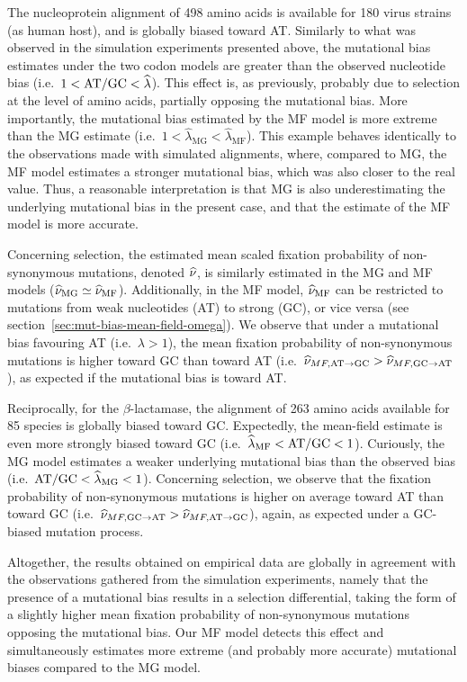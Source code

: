 The nucleoprotein alignment of 498 amino acids is available for 180 virus strains (as human host), and is globally biased toward AT.
Similarly to what was observed in the simulation experiments presented above, the mutational bias estimates under the two codon models are greater than the observed nucleotide bias (i.e.~$1 < \text{AT/GC} < \widehat{\lambda}$).
This effect is, as previously, probably due to selection at the level of amino acids, partially opposing the mutational bias.
More importantly, the mutational bias estimated by the MF model is more extreme than the MG estimate (i.e.~$1 < \widehat{\lambda}_{\text{MG}} < \widehat{\lambda}_{\text{MF}}$).
This example behaves identically to the observations made with simulated alignments, where, compared to MG, the MF model estimates a stronger mutational bias, which was also closer to the real value.
Thus, a reasonable interpretation is that MG is also underestimating the underlying mutational bias in the present case, and that the estimate of the MF model is more accurate.

Concerning selection, the estimated mean scaled fixation probability of non-synonymous mutations, denoted $\widehat{\nu}$, is similarly estimated in the MG and MF models ($\widehat{\nu}_{\text{MG}} \simeq \widehat{\nu}_{\text{MF}}$).
Additionally, in the MF model, $\widehat{\nu}_{\text{MF}}$ can be restricted to mutations from weak nucleotides (AT) to strong (GC), or vice versa (see section~\ref{sec:mut-bias-mean-field-omega}).
We observe that under a mutational bias favouring AT (i.e.~$\lambda > 1$), the mean fixation probability of non-synonymous mutations is higher toward GC than toward AT (i.e.~$\widehat{\nu}_{MF,\text{AT} \rightarrow \text{GC}} > \widehat{\nu}_{MF,\text{GC} \rightarrow \text{AT}}$), as expected if the mutational bias is toward AT.

Reciprocally, for the $\beta$-lactamase, the alignment of 263 amino acids available for 85 species is globally biased toward GC.
Expectedly, the mean-field estimate is even more strongly biased toward GC (i.e.~$\widehat{\lambda}_{\text{MF}} < \text{AT/GC} < 1$).
Curiously, the MG model estimates a weaker underlying mutational bias than the observed bias (i.e.~$ \text{AT/GC} < \widehat{\lambda}_{\text{MG}} < 1$).
Concerning selection, we observe that the fixation probability of non-synonymous mutations is higher on average toward AT than toward GC (i.e.~$\widehat{\nu}_{MF,\text{GC} \rightarrow \text{AT}} > \widehat{\nu}_{MF,\text{AT} \rightarrow \text{GC}}$), again, as expected under a GC-biased mutation process.

Altogether, the results obtained on empirical data are globally in agreement with the observations gathered from the simulation experiments, namely that the presence of a mutational bias results in a selection differential, taking the form of a slightly higher mean fixation probability of non-synonymous mutations opposing the mutational bias.
Our MF model detects this effect and simultaneously estimates more extreme (and probably more accurate) mutational biases compared to the MG model.


